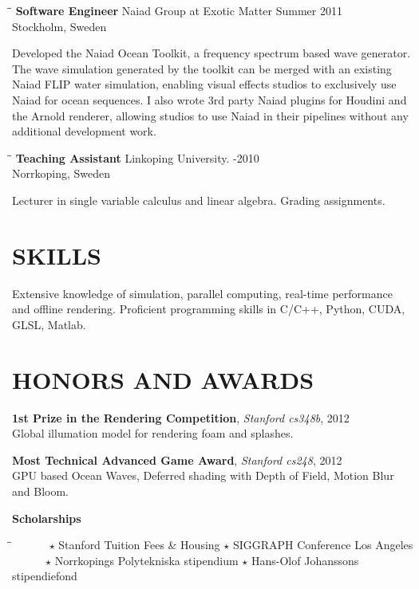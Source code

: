 \documentclass{res}
\begin{document}
\begin{resume}
   \begin{tabbing}
   \hspace{2.3in}\= \hspace{2.9in}\= \kill %
    {\bf Software Engineer} \>Naiad Group at Exotic Matter \> Summer 2011\\
                          \>Stockholm, Sweden
   \end{tabbing}\vspace{-20pt}
    Developed the Naiad Ocean Toolkit, a frequency spectrum based wave generator. The wave simulation generated by the toolkit can be merged with an existing Naiad FLIP water simulation, enabling visual effects studios to exclusively use Naiad for ocean sequences. I also wrote 3rd party Naiad plugins for Houdini and the Arnold renderer, allowing studios to use Naiad in their pipelines without any additional development work.
   \begin{tabbing}%
   \hspace{2.3in}\= \hspace{3.1in}\= \kill %
   {\bf Teaching Assistant}  \>Linkoping University. -2010\\
                          \>Norrkoping, Sweden
   \end{tabbing}\vspace{-20pt}
    Lecturer in single variable calculus and linear algebra. Grading assignments.       


\section{SKILLS}
Extensive knowledge of simulation, parallel computing, real-time performance and offline rendering.
Proficient programming skills in C/C++, Python, CUDA, GLSL, Matlab.
 
\section{HONORS AND AWARDS}
{\bf1st Prize in the Rendering Competition}, \emph{Stanford cs348b}, 2012\\
Global illumation model for rendering foam and splashes.

{\bf Most Technical Advanced Game Award}, \emph{Stanford cs248}, 2012\\
GPU based Ocean Waves, Deferred shading with Depth of
Field, Motion Blur and Bloom.

{\bf Scholarships}
 \vspace{-0.2in}	
\begin{tabbing}%
   \hspace{3.3in}\= \hspace{3.6in}\= \kill %
   ~~~~~~$\star$ Stanford Tuition Fees \& Housing \> $\star$ SIGGRAPH Conference Los Angeles \\
   ~~~~~~$\star$ Norrkopings Polytekniska stipendium \> $\star$ Hans-Olof Johanssons stipendiefond
   \end{tabbing}\vspace{-20pt}
\end{resume}
\end{document}
